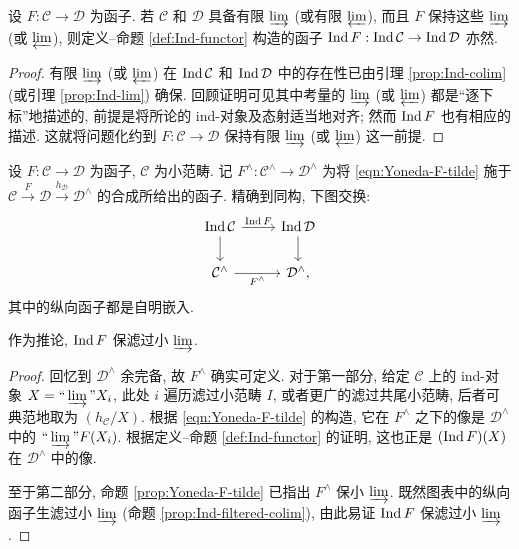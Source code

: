 \begin{lemma}\label{prop:Ind-hat-functor-prep}
	设 $F: \mathcal{C} \to \mathcal{D}$ 为函子. 若 $\mathcal{C}$ 和 $\mathcal{D}$ 具备有限 $\varinjlim$ (或有限 $\varprojlim$), 而且 $F$ 保持这些 $\varinjlim$ (或 $\varprojlim$), 则定义--命题 \ref{def:Ind-functor} 构造的函子 $\operatorname{Ind} F: \operatorname{Ind}\mathcal{C} \to \operatorname{Ind}\mathcal{D}$ 亦然.
\end{lemma}
\begin{proof}
	有限 $\varinjlim$ (或 $\varprojlim$) 在 $\operatorname{Ind}\mathcal{C}$ 和 $\operatorname{Ind}\mathcal{D}$ 中的存在性已由引理 \ref{prop:Ind-colim} (或引理 \ref{prop:Ind-lim}) 确保. 回顾证明可见其中考量的 $\varinjlim$ (或 $\varprojlim$) 都是``逐下标''地描述的, 前提是将所论的 ind-对象及态射适当地对齐; 然而 $\operatorname{Ind} F$ 也有相应的描述. 这就将问题化约到 $F: \mathcal{C} \to \mathcal{D}$ 保持有限 $\varinjlim$ (或 $\varprojlim$) 这一前提.
\end{proof}

\begin{lemma}\label{prop:IndF-vs-Yoneda}
	设 $F: \mathcal{C} \to \mathcal{D}$ 为函子, $\mathcal{C}$ 为小范畴. 记 $F^\wedge: \mathcal{C}^\wedge \to \mathcal{D}^\wedge$ 为将 \eqref{eqn:Yoneda-F-tilde} 施于 $\mathcal{C} \xrightarrow{F} \mathcal{D} \xrightarrow{h_{\mathcal{D}}} \mathcal{D}^\wedge$ 的合成所给出的函子. 精确到同构, 下图交换:
	\[\begin{tikzcd}
		\IndC\mathcal{C} \arrow[r, "{\IndC F}"] \arrow[d] & \IndC\mathcal{D} \arrow[d] \\
		\mathcal{C}^\wedge \arrow[r, "{F^\wedge}"'] & \mathcal{D}^\wedge ,
	\end{tikzcd}\]
	其中的纵向函子都是自明嵌入.
	
	作为推论, $\operatorname{Ind} F$ 保滤过小 $\varinjlim$.
\end{lemma}
\begin{proof}
	回忆到 $\mathcal{D}^\wedge$ 余完备, 故 $F^\wedge$ 确实可定义. 对于第一部分, 给定 $\mathcal{C}$ 上的 ind-对象 $X = \Yinjlim X_i$, 此处 $i$ 遍历滤过小范畴 $I$, 或者更广的滤过共尾小范畴, 后者可典范地取为 $(h_{\mathcal{C}}/X)$. 根据 \eqref{eqn:Yoneda-F-tilde} 的构造, 它在 $F^\wedge$ 之下的像是 $\mathcal{D}^\wedge$ 中的 $\Yinjlim F(X_i)$. 根据定义--命题 \ref{def:Ind-functor} 的证明, 这也正是 $(\operatorname{Ind} F)(X)$ 在 $\mathcal{D}^\wedge$ 中的像.
	
	至于第二部分, 命题 \ref{prop:Yoneda-F-tilde} 已指出 $F^\wedge$ 保小 $\varinjlim$. 既然图表中的纵向函子生滤过小 $\varinjlim$ (命题 \ref{prop:Ind-filtered-colim}), 由此易证 $\operatorname{Ind} F$ 保滤过小 $\varinjlim$.
\end{proof}

